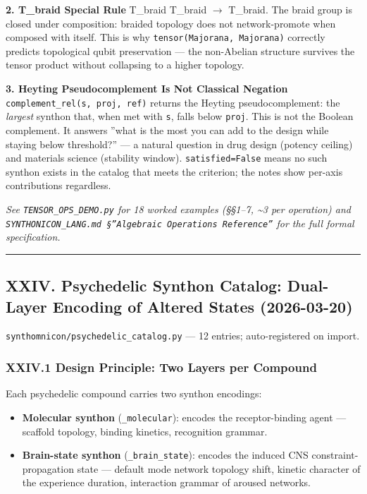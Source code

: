 \documentclass[12pt,a4paper]{article}
\begin{document}
\textbf{2. T\_braid Special Rule}
T\_braid \otimes T\_braid $\rightarrow$ T\_braid. The braid group is closed under composition: braided topology does not network-promote when composed with itself. This is why \texttt{tensor(Majorana, Majorana)} correctly predicts topological qubit preservation --- the non-Abelian structure survives the tensor product without collapsing to a higher topology.

\textbf{3. Heyting Pseudocomplement Is Not Classical Negation}
\texttt{complement\_rel(s, proj, ref)} returns the Heyting pseudocomplement: the \emph{largest} synthon that, when met with \texttt{s}, falls below \texttt{proj}. This is not the Boolean complement. It answers ''what is the most you can add to the design while staying below threshold?'' --- a natural question in drug design (potency ceiling) and materials science (stability window). \texttt{satisfied=False} means no such synthon exists in the catalog that meets the criterion; the notes show per-axis contributions regardless.

\emph{See \texttt{TENSOR\_OPS\_DEMO.py} for 18 worked examples (§§1--7, \textasciitilde{}3 per operation) and \texttt{SYNTHONICON\_LANG.md §''Algebraic Operations Reference''} for the full formal specification.}

\begin{center}
\rule{0.5\textwidth}{0.4pt}
\end{center}

\subsection{XXIV. Psychedelic Synthon Catalog: Dual-Layer Encoding of Altered States (2026-03-20)}

\texttt{synthomnicon/psychedelic\_catalog.py} --- 12 entries; auto-registered on import.

\subsubsection{XXIV.1 Design Principle: Two Layers per Compound}

Each psychedelic compound carries two synthon encodings:

\begin{itemize}
    \item \textbf{Molecular synthon} (\texttt{\_molecular}): encodes the receptor-binding agent --- scaffold topology, binding kinetics, recognition grammar.
    \item \textbf{Brain-state synthon} (\texttt{\_brain\_state}): encodes the induced CNS constraint-propagation state --- default mode network topology shift, kinetic character of the experience duration, interaction grammar of aroused networks.
\end{itemize}
\end{document}
